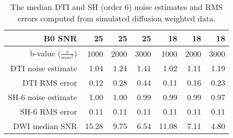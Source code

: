 \begin{table}
\caption{
\label{tabIMsimEstimate}
The median DTI and SH (order 6) noise estimates and RMS errors computed from simulated diffusion weighted data.}
\begin{tabular}[c]{@{}rrrrrrr@{}}
\toprule
B0 SNR & 25 & 25 & 25 & 18 & 18 & 18\tabularnewline
\midrule
b-value (\(\frac{s}{mm^{2}}\)) & 1000 & 2000 & 3000 & 1000 & 2000 &
3000\tabularnewline
DTI noise estimate & 1.04 & 1.24 & 1.41 & 1.02 & 1.11 &
1.19\tabularnewline
DTI RMS error & 0.12 & 0.28 & 0.44 & 0.11 & 0.16 & 0.23\tabularnewline
SH-6 noise estimate & 1.00 & 1.00 & 0.99 & 0.99 & 0.99 &
0.97\tabularnewline
SH-6 RMS error & 0.11 & 0.11 & 0.11 & 0.11 & 0.11 & 0.11\tabularnewline
DWI median SNR & 15.28 & 9.75 & 6.54 & 11.08 & 7.11 & 4.80
\bottomrule

\end{tabular}
\end{table}
